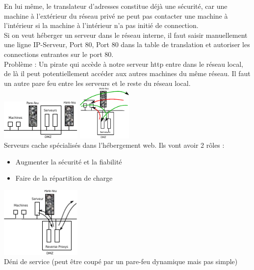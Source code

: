 En lui même, le translateur d'adresses constitue déjà une sécurité, car une machine à l'extérieur du réseau privé ne peut pas contacter une machine à l'intérieur si la machine à l'intérieur n'a pas initié de connection. \\
Si on veut héberger un serveur dans le réseau interne, il faut saisir manuellement une ligne IP-Serveur, Port 80, Port 80 dans la table de translation et autoriser les connections entrantes sur le port 80. \\
Problème : Un pirate qui accède à notre serveur http entre dans le réseau local, de là il peut potentiellement accéder aux autres machines du même réseau. Il faut un autre pare feu entre les serveurs et le reste du réseau local. \\

\includegraphics[width=150px]{Images/21_DMZ.pdf}
\includegraphics[width=100px]{Images/22_DMZ.pdf}\\

 Serveurs cache spécialisés dans l'hébergement web. Ils vont avoir 2 rôles : 
	\begin{itemize}
		\item Augmenter la sécurité et la fiabilité
		\item Faire de la répartition de charge
	\end{itemize}

\includegraphics[width=150px]{Images/23_ReverseProxy.pdf}\\

 Déni de service (peut être coupé par un pare-feu dynamique mais pas simple)
